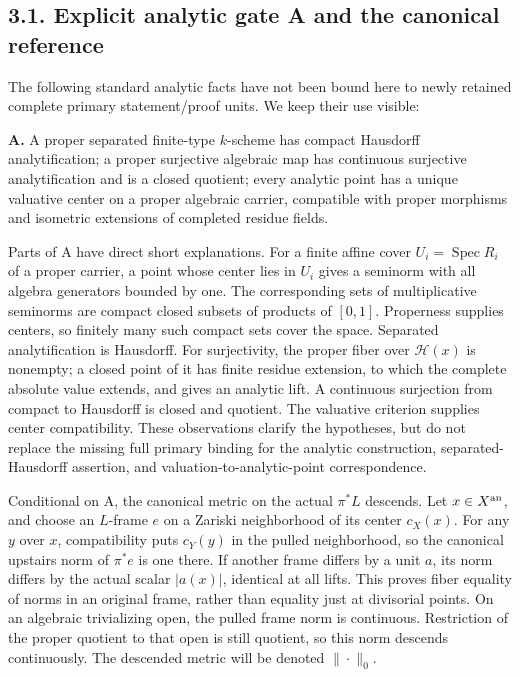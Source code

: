 \documentclass[
  10pt,
]{article}
\begin{document}
\subsection{3.1. Explicit analytic gate A and the canonical
reference}\label{explicit-analytic-gate-a-and-the-canonical-reference}

The following standard analytic facts have not been bound here to newly
retained complete primary statement/proof units. We keep their use
visible:

\textbf{A.} A proper separated finite-type \(k\)-scheme has compact
Hausdorff analytification; a proper surjective algebraic map has
continuous surjective analytification and is a closed quotient; every
analytic point has a unique valuative center on a proper algebraic
carrier, compatible with proper morphisms and isometric extensions of
completed residue fields.

Parts of A have direct short explanations. For a finite affine cover
\(U_i=\operatorname{Spec}R_i\) of a proper carrier, a point whose center
lies in \(U_i\) gives a seminorm with all algebra generators bounded by
one. The corresponding sets of multiplicative seminorms are compact
closed subsets of products of \([0,1]\). Properness supplies centers, so
finitely many such compact sets cover the space. Separated
analytification is Hausdorff. For surjectivity, the proper fiber over
\(\mathcal H(x)\) is nonempty; a closed point of it has finite residue
extension, to which the complete absolute value extends, and gives an
analytic lift. A continuous surjection from compact to Hausdorff is
closed and quotient. The valuative criterion supplies center
compatibility. These observations clarify the hypotheses, but do not
replace the missing full primary binding for the analytic construction,
separated-Hausdorff assertion, and valuation-to-analytic-point
correspondence.

Conditional on A, the canonical metric on the actual \(\pi^*L\)
descends. Let \(x\in X^{\rm an}\), and choose an \(L\)-frame \(e\) on a
Zariski neighborhood of its center \(c_X(x)\). For any \(y\) over \(x\),
compatibility puts \(c_Y(y)\) in the pulled neighborhood, so the
canonical upstairs norm of \(\pi^*e\) is one there. If another frame
differs by a unit \(a\), its norm differs by the actual scalar
\(|a(x)|\), identical at all lifts. This proves fiber equality of norms
in an original frame, rather than equality just at divisorial points. On
an algebraic trivializing open, the pulled frame norm is continuous.
Restriction of the proper quotient to that open is still quotient, so
this norm descends continuously. The descended metric will be denoted
\(\|\cdot\|_0\).
\end{document}
